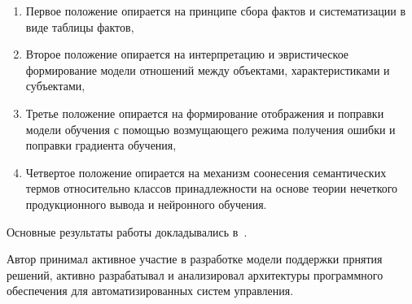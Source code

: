 {}
\begin{enumerate}[beginpenalty=10000] %
  \item Первое положение опирается на принципе сбора фактов и систематизации в виде таблицы фактов,
  \item Второе положение опирается на интерпретацию и эвристическое формирование модели отношений между объектами, характеристиками и субъектами,
  \item Третье положение опирается на формирование отображения и поправки модели обучения с помощью возмущающего режима получения ошибки и поправки градиента обучения,
  \item Четвертое положение опирается на механизм соонесения семантических термов относительно классов принадлежности на основе теории нечеткого продукционного вывода и нейронного обучения.
\end{enumerate}


{\probation}
Основные результаты работы докладывались в~\cite{aaij2022searches, baptista2021angular, leite2021observation,baptista2021searches,collaboration2021measurement,baptista2021measurement,aaij2021precision,aaij2022identification,bediaga2020measurement, aaij2021constraints,   onderwater2020study, aaij2022arxiv,     aaij2019arxiv,aaij2021evidence,aaij2020aps,baptista2021observation,baptista2021search,aaij2020isospin,  aaij2019precision,aaij2019search, lhcb2108evidence,aaij2022study,         aaij2022first,aaij2022j,  aaij2022observation, aaij2022tests}.


{\contribution} Автор принимал активное участие в разработке модели поддержки прнятия решений, активно разрабатывал и анализировал архитектуры программного обеспечения для автоматизированных систем управления. 

